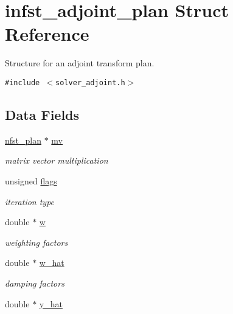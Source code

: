 \hypertarget{structinfst__adjoint__plan}{
\section{infst\_\-adjoint\_\-plan Struct Reference}
\label{structinfst__adjoint__plan}
}
Structure for an adjoint transform plan.  


{\tt \#include $<$solver\_\-adjoint.h$>$}

\subsection*{Data Fields}
\begin{CompactItemize}
\item 
\hypertarget{structinfst__adjoint__plan_o0}{
\hyperlink{structnfst__plan}{nfst\_\-plan} $\ast$ \hyperlink{structinfst__adjoint__plan_o0}{mv}}
\label{structinfst__adjoint__plan_o0}

\begin{CompactList}\small\item\em matrix vector multiplication \item\end{CompactList}\item 
\hypertarget{structinfst__adjoint__plan_o1}{
unsigned \hyperlink{structinfst__adjoint__plan_o1}{flags}}
\label{structinfst__adjoint__plan_o1}

\begin{CompactList}\small\item\em iteration type \item\end{CompactList}\item 
\hypertarget{structinfst__adjoint__plan_o2}{
double $\ast$ \hyperlink{structinfst__adjoint__plan_o2}{w}}
\label{structinfst__adjoint__plan_o2}

\begin{CompactList}\small\item\em weighting factors \item\end{CompactList}\item 
\hypertarget{structinfst__adjoint__plan_o3}{
double $\ast$ \hyperlink{structinfst__adjoint__plan_o3}{w\_\-hat}}
\label{structinfst__adjoint__plan_o3}

\begin{CompactList}\small\item\em damping factors \item\end{CompactList}\item 
\hypertarget{structinfst__adjoint__plan_o4}{
double $\ast$ \hyperlink{structinfst__adjoint__plan_o4}{y\_\-hat}}
\label{structinfst__adjoint__plan_o4}


\end{CompactItemize}
